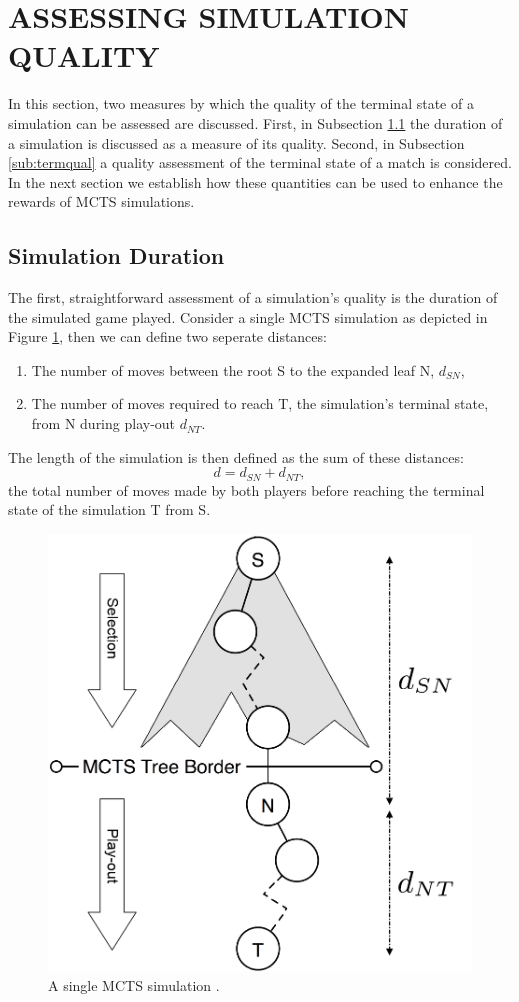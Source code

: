 \documentclass{ecai2014}
\newcommand{\node}[1]{{\fontfamily{phv}\selectfont#1}}
\begin{document}
\section{ASSESSING SIMULATION QUALITY}
\label{sec:poqual}
In this section, two measures by which the quality of the terminal state of a simulation can be assessed are discussed. First, in Subsection \ref{sub:simdur} the duration of a simulation is discussed as a measure of its quality. Second, in Subsection \ref{sub:termqual} a quality assessment of the terminal state of a match is considered. In the next section we establish how these quantities can be used to enhance the rewards of MCTS simulations. 

\subsection{Simulation Duration} 
\label{sub:simdur}
The first, straightforward assessment of a simulation's quality is the duration of the simulated game played. Consider a single MCTS simulation as depicted in Figure \ref{fig:mcts-simulation}, then we can define two seperate distances: 
\begin{enumerate}
\item The number of moves between the root \node{S} to the expanded leaf \node{N}, $d_{SN}$,
\item The number of moves required to reach \node{T}, the simulation's terminal state, from \node{N} during play-out $d_{NT}$.
\end{enumerate}
The length of the simulation is then defined as the sum of these distances:
\begin{equation}
d = d_{SN} + d_{NT},
\label{eq:m_ST}
\end{equation}
the total number of moves made by both players before reaching the terminal state of the simulation \node{T} from \node{S}.
\begin{figure}[t]
	\centering
	\includegraphics[width=.3\textwidth]{img/figure2_new.png}
	\caption{A single MCTS simulation \cite{finnsson2010learning}.}
	\label{fig:mcts-simulation}
\end{figure}
\end{document}
